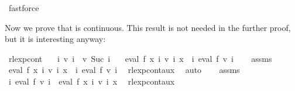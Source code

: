 \begin{isabellebody}
\isamarkupfalse%
\ fastforce{\isacharplus}{\kern0pt}%
\endisatagproof
{\isafoldproof}%
%
\isadelimproof
%
\endisadelimproof
%
\begin{isamarkuptext}%
Now we prove that  is continuous. This result is not needed in the further
proof, but it is interesting anyway:%
\end{isamarkuptext}\isamarkuptrue%
\isamarkupfalse%
\ rlexp{\isacharunderscore}{\kern0pt}cont{\isacharcolon}{\kern0pt}\isanewline
\ \ \ {\isachardoublequoteopen}{\isasymforall}i{\isachardot}{\kern0pt}\ v\ i\ {\isasymle}\ v\ {\isacharparenleft}{\kern0pt}Suc\ i{\isacharparenright}{\kern0pt}{\isachardoublequoteclose}\isanewline
\ \ \ {\isachardoublequoteopen}eval\ f\ {\isacharparenleft}{\kern0pt}{\isasymlambda}x{\isachardot}{\kern0pt}\ {\isasymUnion}i{\isachardot}{\kern0pt}\ v\ i\ x{\isacharparenright}{\kern0pt}\ {\isacharequal}{\kern0pt}\ {\isacharparenleft}{\kern0pt}{\isasymUnion}i{\isachardot}{\kern0pt}\ eval\ f\ {\isacharparenleft}{\kern0pt}v\ i{\isacharparenright}{\kern0pt}{\isacharparenright}{\kern0pt}{\isachardoublequoteclose}\isanewline
%
\isadelimproof
%
\endisadelimproof
%
\isatagproof
{}\isamarkupfalse%
\isanewline
\ \ \isamarkupfalse%
\ assms\ \isamarkupfalse%
\ {\isachardoublequoteopen}eval\ f\ {\isacharparenleft}{\kern0pt}{\isasymlambda}x{\isachardot}{\kern0pt}\ {\isasymUnion}i{\isachardot}{\kern0pt}\ v\ i\ x{\isacharparenright}{\kern0pt}\ {\isasymsubseteq}\ {\isacharparenleft}{\kern0pt}{\isasymUnion}i{\isachardot}{\kern0pt}\ eval\ f\ {\isacharparenleft}{\kern0pt}v\ i{\isacharparenright}{\kern0pt}{\isacharparenright}{\kern0pt}{\isachardoublequoteclose}\ \isamarkupfalse%
\ rlexp{\isacharunderscore}{\kern0pt}cont{\isacharunderscore}{\kern0pt}aux{}\ \isamarkupfalse%
\ auto\isanewline
\ \ \isamarkupfalse%
\ assms\ \isamarkupfalse%
\ {\isachardoublequoteopen}{\isacharparenleft}{\kern0pt}{\isasymUnion}i{\isachardot}{\kern0pt}\ eval\ f\ {\isacharparenleft}{\kern0pt}v\ i{\isacharparenright}{\kern0pt}{\isacharparenright}{\kern0pt}\ {\isasymsubseteq}\ eval\ f\ {\isacharparenleft}{\kern0pt}{\isasymlambda}x{\isachardot}{\kern0pt}\ {\isasymUnion}i{\isachardot}{\kern0pt}\ v\ i\ x{\isacharparenright}{\kern0pt}{\isachardoublequoteclose}\ \isamarkupfalse%
\ rlexp{\isacharunderscore}{\kern0pt}cont{\isacharunderscore}{\kern0pt}aux{}\ \isamarkupfalse%

\end{isabellebody}
